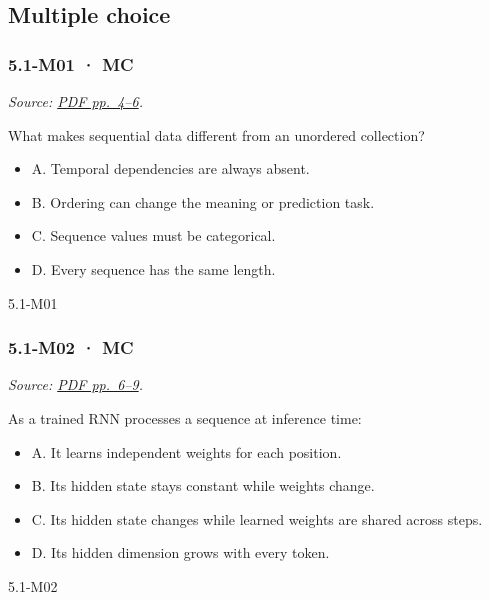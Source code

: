 \subsection{Multiple choice}\label{multiple-choice-12}

\noindent\begin{minipage}{\linewidth}

\subsubsection{5.1-M01 · MC}\label{m01-mc-12}

\emph{Source:
\href{../Lecture\%20Slides/5.1.\%20Sequence\%20Models.pdf\#page=4}{PDF
pp.~4--6}.}

What makes sequential data different from an unordered collection?

\begin{itemize}
\tightlist
\item
  A. Temporal dependencies are always absent.
\item
  B. Ordering can change the meaning or prediction task.
\item
  C. Sequence values must be categorical.
\item
  D. Every sequence has the same length.
\end{itemize}

\begin{solution}[8mm]{5.1-M01}

\end{solution}
\end{minipage}\par\medskip

\noindent\begin{minipage}{\linewidth}

\subsubsection{5.1-M02 · MC}\label{m02-mc-12}

\emph{Source:
\href{../Lecture\%20Slides/5.1.\%20Sequence\%20Models.pdf\#page=6}{PDF
pp.~6--9}.}

As a trained RNN processes a sequence at inference time:

\begin{itemize}
\tightlist
\item
  A. It learns independent weights for each position.
\item
  B. Its hidden state stays constant while weights change.
\item
  C. Its hidden state changes while learned weights are shared across
  steps.
\item
  D. Its hidden dimension grows with every token.
\end{itemize}

\begin{solution}[8mm]{5.1-M02}

\end{solution}
\end{minipage}\par\medskip

